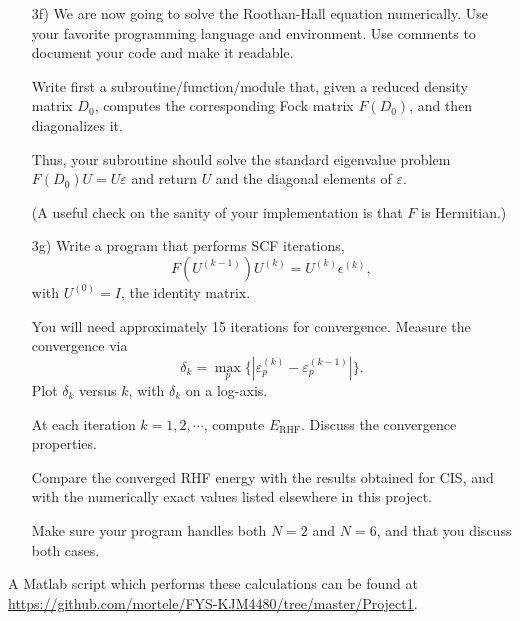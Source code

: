 \documentclass[a4paper]{article}
\begin{document}
\begin{exframe}
\begin{itemize}
  \item[3f)] We are now going to solve the Roothan-Hall equation numerically. Use your favorite programming language and environment. Use comments to document your code and make it readable.

  Write first a subroutine/function/module that, given a reduced
  density matrix $D_0$, computes the corresponding Fock matrix
  $F(D_0)$, and then diagonalizes it.

  Thus, your subroutine should solve the standard eigenvalue problem
  $F(D_0)U = U\varepsilon$ and return $U$ and the diagonal elements of
  $\varepsilon$.

  (A useful check on the sanity of your implementation is that $F$ is
  Hermitian.)
\end{itemize}
\end{exframe}
\begin{exframe}
\begin{itemize}
  \item[3g)] Write a program that performs SCF iterations,
  \begin{equation}
    F(U^{(k-1)}) U^{(k)} = U^{(k)}\epsilon^{(k)},
  \end{equation}
  with $U^{(0)}=I$, the identity matrix.

  You will need approximately 15 iterations for convergence. Measure
  the convergence via
  \begin{equation}
    \delta_k = \max_p\{|\varepsilon^{(k)}_p - \varepsilon^{(k-1)}_p|\}.
  \end{equation}
  Plot $\delta_k$ versus $k$, with $\delta_k$ on a log-axis.
  
  At each iteration $k=1,2,\cdots$, compute $E_\text{RHF}$. Discuss the
  convergence properties.

  Compare the converged RHF energy with the results obtained for CIS,
  and with the numerically exact values listed elsewhere in this project.

  Make sure your program handles both $N=2$ and $N=6$, and that you
  discuss both cases.
\end{itemize}
\end{exframe}
A {\sc Matlab} script which performs these calculations can be found at \url{https://github.com/mortele/FYS-KJM4480/tree/master/Project1}.
\end{document}
